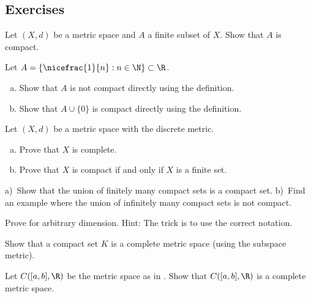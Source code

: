 \documentclass[12pt]{book}
\begin{document}
\subsection*{Exercises}

\begin{exercise}
Let $(X,d)$ be a metric space and $A$ a finite subset of $X$.
Show that $A$ is compact.
\end{exercise}

\begin{exercise}
Let $A = \{ \nicefrac{1}{n} : n \in \N \} \subset \R$.  
\begin{enumerate}[a)]
 \item Show that $A$ is
not compact directly using the definition.
 \item Show that $A \cup \{ 0 \}$ is
compact directly using the definition.
\end{enumerate}
\end{exercise}


\begin{exercise}
Let $(X,d)$ be a metric space with the discrete metric.  
\begin{enumerate}[a)]
\item Prove that $X$ is complete.
\item Prove that $X$ is compact if and only if $X$ is a finite
set.
\end{enumerate}
\end{exercise}

\begin{exercise}
a)~Show that the union of finitely many compact sets is a compact set.
b)~Find an example where the union of infinitely many compact sets is not
compact.
\end{exercise}

\begin{exercise}
Prove  for arbitrary dimension.
Hint: The trick is to use the correct notation.
\end{exercise}

\begin{exercise}
Show that a compact set $K$ is a complete metric space (using the subspace
metric).
\end{exercise}

\begin{exercise} \label{exercise:CabRcomplete}
Let $C([a,b],\R)$ be the metric space as in .
Show that
$C([a,b],\R)$ is a complete metric space.
\end{exercise}
\end{document}

